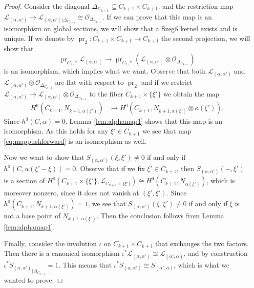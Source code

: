 \documentclass[12pt]{amsart}
\numberwithin{equation}{section}
\numberwithin{thmcounter}{section}
\theoremstyle{definition}
\theoremstyle{claim}
\newcommand{\sO}{\mathscr{O}}
\newcommand{\sL}{\mathscr{L}}
\DeclareMathOperator{\pr}{pr}
\begin{document}
\begin{proof}
	Consider the diagonal $\Delta_{C_{k+1}}\subseteq C_{k+1}\times C_{k+1}$.  and the restriction map $\mathscr{L}_{(\alpha,\alpha')} \longrightarrow \mathscr{L}_{(\alpha,\alpha')|\Delta_{C_{k+1}}} \cong \sO_{\Delta_{C_{k+1}}}$. If we can prove that this map is an isomorphism on global sections, we will show that a Szeg\H{o} kernel exists and is unique. If we denote by $\pr_2\colon C_{k+1}\times C_{k+1 } \to C_{k+1}$ the second projection, we will show that
	\begin{equation}\label{eq:mappushforward}
	\pr_{C_2,*}\mathscr{L}_{(\alpha,\alpha')} \longrightarrow \pr_{C_2,*}(\mathscr{L}_{(\alpha,\alpha')}\otimes \sO_{\Delta_{C_{k+1}}})
	\end{equation}
	is an isomorphism, which implies what we want. Observe that both $\mathscr{L}_{(\alpha,\alpha')}$ and $\mathscr{L}_{(\alpha,\alpha')}\otimes \sO_{\Delta_{C_{k+1}}}$ are flat with respect to $\pr_2$ and if we restrict $\mathscr{L}_{(\alpha,\alpha')}\to \mathscr{L}_{(\alpha,\alpha')}\otimes \sO_{\Delta_{C_{k+1}}}$ to the fiber $C_{k+1}\times \{\xi'\}$ we obtain the map
	\begin{align}
	H^0(C_{k+1},N_{k+1,\alpha(\xi')}) &\longrightarrow H^0(C_{k+1},N_{k+1,\alpha(\xi')}\otimes \kappa(\xi')).
	\end{align}
	Since $h^0(C,\alpha)=0$, Lemma \ref{lem:alphamap1} shows that this map is an isomorphism. As this holds for any $\xi'\in C_{k+1}$ we see that map \eqref{eq:mappushforward} is an isomorphism as well.

\medskip

\noindent	Now we want to show that $S_{(\alpha,\alpha')}(\xi,\xi')\ne 0$ if and only if $h^0(C,\alpha(\xi'-\xi))=0$. Observe that if we fix $\xi'\in C_{k+1}$, then $S_{(\alpha,\alpha')}(-,\xi')$ is a  section of $H^0(C_{k+1}\times \{\xi'\},\mathscr{L}_{C_{k+1}\times \{\xi'\}}) \cong H^0(C_{k+1},N_{\alpha(\xi')})$, which is moreover nonzero, since it does not vanish at $(\xi',\xi')$. Since $h^0(C_{k+1},N_{k+1,\alpha(\xi')})=1$, we see that $S_{(\alpha,\alpha')}(\xi,\xi')\ne 0$ if and only if $\xi$ is not a base point of $N_{k+1,\alpha(\xi')}$. Then the conclusion follows from Lemma \ref{lem:alphamap1}.

\medskip

\noindent	Finally, consider the involution $\iota$ on $C_{k+1}\times C_{k+1}$ that exchanges the two factors. Then there is a canonical  isomorphism  $\iota^*\mathscr{L}_{(\alpha,\alpha')} \cong \sL_{(\alpha',\alpha)}$, and by construction  ${\iota^*S_{(\alpha,\alpha')}}_{|\Delta_{C_{k+1}}}= 1$. This means that $\iota^*S_{(\alpha,\alpha')} \cong S_{(\alpha',\alpha)}$, which is what we wanted to prove.
\end{proof}
\end{document}
